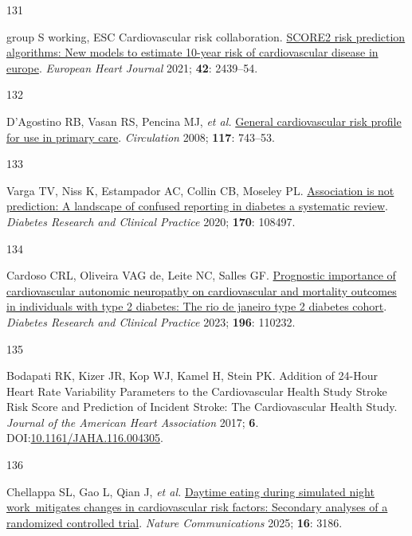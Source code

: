 \documentclass[
  letterpaper,
  headsepline=true,
  open=any]{scrbook}
\newlength{\cslhangindent}
\newlength{\csllabelwidth}
\newlength{\cslentryspacingunit} %
\newenvironment{CSLReferences}[2] %
 {%
  \setlength{\parindent}{0pt}
  \ifodd #1
  \let\oldpar\par
  \def\par{\hangindent=\cslhangindent\oldpar}
  \fi
  \setlength{\parskip}{#2\cslentryspacingunit}
 }%
 {}
\newcommand{\CSLLeftMargin}[1]{\parbox[t]{\csllabelwidth}{#1}}
\newcommand{\CSLRightInline}[1]{\parbox[t]{\linewidth - \csllabelwidth}{#1}\break}
\begin{document}
\begin{CSLReferences}{0}{0}
\leavevmode{}%
\CSLLeftMargin{131 }%
\CSLRightInline{group S working, ESC Cardiovascular risk collaboration.
\href{https://doi.org/10.1093/eurheartj/ehab309}{SCORE2 risk prediction
algorithms: New models to estimate 10-year risk of cardiovascular
disease in europe}. \emph{European Heart Journal} 2021; \textbf{42}:
2439--54.}

\leavevmode{}%
\CSLLeftMargin{132 }%
\CSLRightInline{D'Agostino RB, Vasan RS, Pencina MJ, \emph{et al.}
\href{https://doi.org/10.1161/CIRCULATIONAHA.107.699579}{General
cardiovascular risk profile for use in primary care}. \emph{Circulation}
2008; \textbf{117}: 743--53.}

\leavevmode{}%
\CSLLeftMargin{133 }%
\CSLRightInline{Varga TV, Niss K, Estampador AC, Collin CB, Moseley PL.
\href{https://doi.org/10.1016/j.diabres.2020.108497}{Association is not
prediction: A landscape of confused reporting in diabetes {\textendash}
a systematic review}. \emph{Diabetes Research and Clinical Practice}
2020; \textbf{170}: 108497.}

\leavevmode{}%
\CSLLeftMargin{134 }%
\CSLRightInline{Cardoso CRL, Oliveira VAG de, Leite NC, Salles GF.
\href{https://doi.org/10.1016/j.diabres.2022.110232}{Prognostic
importance of cardiovascular autonomic neuropathy on cardiovascular and
mortality outcomes in individuals with type 2 diabetes: The rio de
janeiro type 2 diabetes cohort}. \emph{Diabetes Research and Clinical
Practice} 2023; \textbf{196}: 110232.}

\leavevmode{}%
\CSLLeftMargin{135 }%
\CSLRightInline{Bodapati RK, Kizer JR, Kop WJ, Kamel H, Stein PK.
Addition of 24-Hour Heart Rate Variability Parameters to the
Cardiovascular Health Study Stroke Risk Score and Prediction of Incident
Stroke: The Cardiovascular Health Study. \emph{Journal of the American
Heart Association} 2017; \textbf{6}.
DOI:\href{https://doi.org/10.1161/JAHA.116.004305}{10.1161/JAHA.116.004305}.}

\leavevmode{}%
\CSLLeftMargin{136 }%
\CSLRightInline{Chellappa SL, Gao L, Qian J, \emph{et al.}
\href{https://doi.org/10.1038/s41467-025-57846-y}{Daytime eating during
simulated night work~mitigates changes in cardiovascular risk factors:
Secondary analyses of a randomized controlled trial}. \emph{Nature
Communications} 2025; \textbf{16}: 3186.}


\end{CSLReferences}
\end{document}
